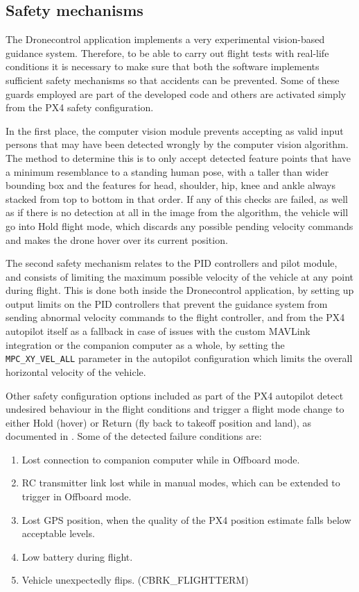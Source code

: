 \subsection{Safety mechanisms}
\label{subsec:safety}

The Dronecontrol application implements a very experimental vision-based guidance system.
Therefore, to be able to carry out flight tests with real-life conditions it is necessary to make sure that both the software implements sufficient safety mechanisms so that accidents can be prevented.
Some of these guards employed are part of the developed code and others are activated simply from the PX4 safety configuration.

In the first place, the computer vision module prevents accepting as valid input persons that may have been detected wrongly by the computer vision algorithm.
The method to determine this is to only accept detected feature points that have a minimum resemblance to a standing human pose, with a taller than wider bounding box and the features for head, shoulder, hip, knee and ankle always stacked from top to bottom in that order.
If any of this checks are failed, as well as if there is no detection at all in the image from the algorithm, the vehicle will go into Hold flight mode, which discards any possible pending velocity commands and makes the drone hover over its current position.

The second safety mechanism relates to the PID controllers and pilot module, and consists of limiting the maximum possible velocity of the vehicle at any point during flight.
This is done both inside the Dronecontrol application, by setting up output limits on the PID controllers that prevent the guidance system from sending abnormal velocity commands to the flight controller, and from the PX4 autopilot itself as a fallback in case of issues with the custom MAVLink integration or the companion computer as a whole, by setting the \texttt{MPC\_XY\_VEL\_ALL} parameter in the autopilot configuration which limits the overall horizontal velocity of the vehicle.

Other safety configuration options included as part of the PX4 autopilot detect undesired behaviour in the flight conditions and trigger a flight mode change to either Hold (hover) or Return (fly back to takeoff position and land), as documented in  \cite{px4-docs-safety}.
Some of the detected failure conditions are:
\begin{enumerate}
    \item Lost connection to companion computer while in Offboard mode.
    \item RC transmitter link lost while in manual modes, which can be extended to trigger in Offboard mode.
    \item Lost GPS position, when the quality of the PX4 position estimate falls below acceptable levels.
    \item Low battery during flight.
    \item Vehicle unexpectedly flips.  (CBRK\_FLIGHTTERM)
\end{enumerate}

